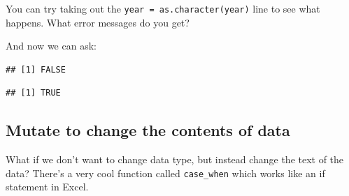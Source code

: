\documentclass[
]{book}
\newenvironment{Shaded}{\begin{snugshade}}{\end{snugshade}}
\newcommand{\DataTypeTok}[1]{\textcolor[rgb]{0.13,0.29,0.53}{#1}}
\newcommand{\KeywordTok}[1]{\textcolor[rgb]{0.13,0.29,0.53}{\textbf{#1}}}
\newcommand{\NormalTok}[1]{#1}
\newcommand{\OperatorTok}[1]{\textcolor[rgb]{0.81,0.36,0.00}{\textbf{#1}}}
\newcommand{\StringTok}[1]{\textcolor[rgb]{0.31,0.60,0.02}{#1}}
\begin{document}
You can try taking out the \texttt{year\ =\ as.character(year)} line to see what happens. What error messages do you get?

And now we can ask:

\begin{Shaded}
\end{Shaded}

\begin{verbatim}
## [1] FALSE
\end{verbatim}

\begin{Shaded}
\end{Shaded}

\begin{verbatim}
## [1] TRUE
\end{verbatim}

\hypertarget{mutate-to-change-the-contents-of-data}{%
\subsection{Mutate to change the contents of data}\label{mutate-to-change-the-contents-of-data}}

What if we don't want to change data type, but instead change the text of the data? There's a very cool function called \texttt{case\_when} which works like an if statement in Excel.

\begin{Shaded}
\end{Shaded}
\end{document}
